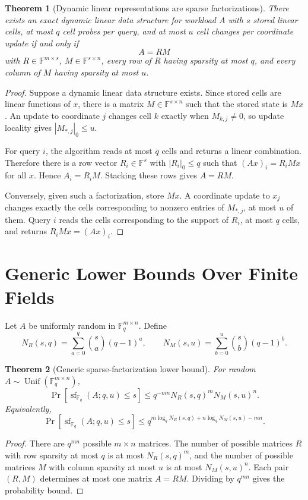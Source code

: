 \documentclass[11pt]{article}
\newtheorem{theorem}{Theorem}[section]
\begin{document}
\begin{theorem}[Dynamic linear representations are sparse factorizations]
There exists an exact dynamic linear data structure for workload $A$ with $s$ stored linear cells, at most $q$ cell probes per query, and at most $u$ cell changes per coordinate update if and only if
\[
A=RM
\]
with $R\in\mathbb F^{m\times s}$, $M\in\mathbb F^{s\times n}$, every row of $R$ having sparsity at most $q$, and every column of $M$ having sparsity at most $u$.
\end{theorem}

\begin{proof}
Suppose a dynamic linear data structure exists. Since stored cells are linear functions of $x$, there is a matrix $M\in\mathbb F^{s\times n}$ such that the stored state is $Mx$. An update to coordinate $j$ changes cell $k$ exactly when $M_{k,j}\ne0$, so update locality gives $|M_{*,j}|_0\le u$.

For query $i$, the algorithm reads at most $q$ cells and returns a linear combination. Therefore there is a row vector $R_i\in\mathbb F^s$ with $|R_i|_0\le q$ such that $(Ax)_i=R_iMx$ for all $x$. Hence $A_i=R_iM$. Stacking these rows gives $A=RM$.

Conversely, given such a factorization, store $Mx$. A coordinate update to $x_j$ changes exactly the cells corresponding to nonzero entries of $M_{*,j}$, at most $u$ of them. Query $i$ reads the cells corresponding to the support of $R_i$, at most $q$ cells, and returns $R_iMx=(Ax)_i$.
\end{proof}

\section{Generic Lower Bounds Over Finite Fields}

Let $A$ be uniformly random in $\mathbb F_q^{m\times n}$. Define
\[
N_R(s,q)=\sum_{a=0}^q {s\choose a}(q-1)^a,
\qquad
N_M(s,u)=\sum_{b=0}^u {s\choose b}(q-1)^b.
\]

\begin{theorem}[Generic sparse-factorization lower bound]
For random $A\sim \operatorname{Unif}(\mathbb F_q^{m\times n})$,
\[
\Pr[\operatorname{sf}_{\mathbb F_q}(A;q,u)\le s]
\le
q^{-mn}N_R(s,q)^mN_M(s,u)^n.
\]
Equivalently,
\[
\Pr[\operatorname{sf}_{\mathbb F_q}(A;q,u)\le s]
\le
q^{m\log_q N_R(s,q)+n\log_q N_M(s,u)-mn}.
\]
\end{theorem}

\begin{proof}
There are $q^{mn}$ possible $m\times n$ matrices. The number of possible matrices $R$ with row sparsity at most $q$ is at most $N_R(s,q)^m$, and the number of possible matrices $M$ with column sparsity at most $u$ is at most $N_M(s,u)^n$. Each pair $(R,M)$ determines at most one matrix $A=RM$. Dividing by $q^{mn}$ gives the probability bound.
\end{proof}
\end{document}
